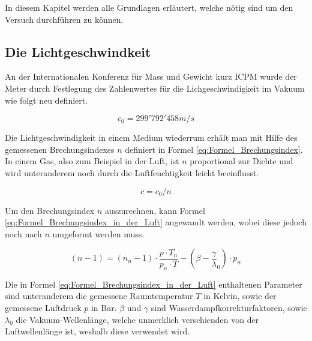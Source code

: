 In diesem Kapitel werden alle Grundlagen erläutert, welche nötig sind um den Versuch durchführen zu können. 

\subsection{Die Lichtgeschwindkeit}
\label{Die Lichtgeschwindkeit}

An der Internationalen Konferenz für Mass und Gewicht kurz ICPM wurde der Meter durch Festlegung des Zahlenwertes für die Lichgeschwindigkeit im Vakuum wie folgt neu definiert.

\begin{equation*}
c_{0} = 299'792'458 m/s
\label{eq:Lichtgeschwindigkeit}
\end{equation*}

Die Lichtgeschwindigkeit in einem Medium wiederrum erhält man mit Hilfe des gemessenen Brechungsindexes $n$ definiert in Formel \ref{eq:Formel_Brechungsindex}. In einem Gas, also zum Beispiel in der Luft, ist $n$ proportional zur Dichte und wird unteranderem noch durch die Luftfeuchtigkeit leicht beeinflusst.

\begin{equation}
c=c_{0}/n
\label{eq:Formel_Brechungsindex}
\end{equation}

Um den Brechungsindex $n$ auszurechnen, kann Formel \ref{eq:Formel_Brechungsindex_in_der_Luft} angewandt werden, wobei diese jedoch noch nach $n$ umgeformt werden muss.

\begin{equation}
(n - 1) = (n_{n} - 1)\cdot\dfrac{p \cdot T_{n}}{p_{n} \cdot T}-(\beta - \dfrac{\gamma}{\lambda}_{0}) \cdot p_{w}
\label{eq:Formel_Brechungsindex_in_der_Luft}
\end{equation}

Die in Formel \ref{eq:Formel_Brechungsindex_in_der_Luft} enthaltenen Parameter sind unteranderem die gemessene Raumtemperatur $T$ in Kelvin, sowie der gemessene Luftdruck $p$ in Bar. $\beta$ und $\gamma$ sind Wasserdampfkorrekturfaktoren, sowie $\lambda_{0}$ die Vakuum-Wellenlänge, welche unmerklich verschienden von der Luftwellenlänge ist, weshalb diese verwendet wird.


